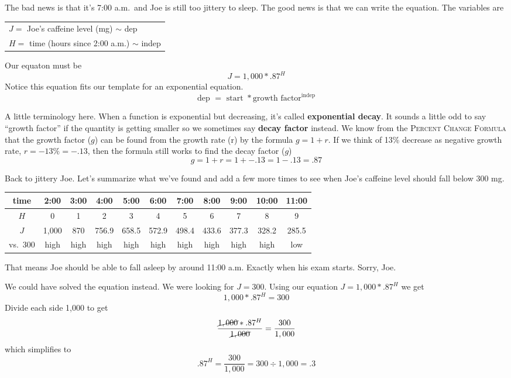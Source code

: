 The bad news is that it's 7:00 a.m.\ and Joe is still too jittery to sleep. 
The good news is that we can write the equation.  The variables are 
\begin{center}
\begin{tabular} {l} 
$J=$ Joe's caffeine level (mg) $\sim$ dep \\ 
$H =$ time (hours since 2:00 a.m.) $\sim$ indep \\
\end{tabular}
\end{center}
Our equaton must be $$ J = 1,000 \ast.87^H$$
Notice this equation fits our template for an exponential equation.
$$\text{dep }=\text{ start } \ast \text{growth factor}^{\text{indep}}$$

A little terminology here. When a function is exponential but decreasing, it's called \textbf{exponential decay}.  It sounds a little odd to say ``growth factor'' if the quantity is getting smaller so we sometimes say \textbf{decay factor} instead.   We know from the \textsc{Percent Change Formula} that the growth factor ($g$) can be found from the growth rate (r) by the formula $g=1+r$.  If we think of 13\% decrease as negative growth rate, $r=-13\%=-.13$, then the formula still works to find the decay factor ($g$)
$$g= 1 + r = 1 + -.13 = 1-.13 = .87$$  

Back to jittery Joe.  Let's summarize what we've found and add a few more times to see when Joe's caffeine level should fall below 300 mg.  
\begin{center}
\begin{tabular} {|c| |c |c |c |c |c |c |c |c |c |c|}\hline
time & 2:00 & 3:00  & 4:00 & 5:00  & 6:00  & 7:00 & 8:00 & 9:00 & 10:00 & 11:00 \\ \hline
$H$ & 0 & 1 & 2 & 3 & 4 & 5 & 6 & 7 & 8 & 9\\ \hline
$J$ & 1,000 & 870 & 756.9 & 658.5 & 572.9 & 498.4 & 433.6 & 377.3 & 328.2 & 285.5 \\ \hline
vs.\ 300 & high & high& high& high& high& high& high& high& high& low\\ \hline
\end{tabular}
\end{center}
That means Joe should be able to fall asleep by around 11:00 a.m.  Exactly when his exam starts.  Sorry, Joe.

We could have solved the equation instead.  We were looking for $J = 300$.  Using our equation $J = 1,000 \ast .87^H$ we get
$$ 1,000 \ast .87^H=300$$
Divide each side 1,000 to get
$$ \frac{\cancel{1,000} \ast .87^H}{\cancel{1,000}}= \frac{300}{1,000}$$
which simplifies to $$.87^H = \frac{300}{1,000} = 300 \div 1,000 = .3$$

